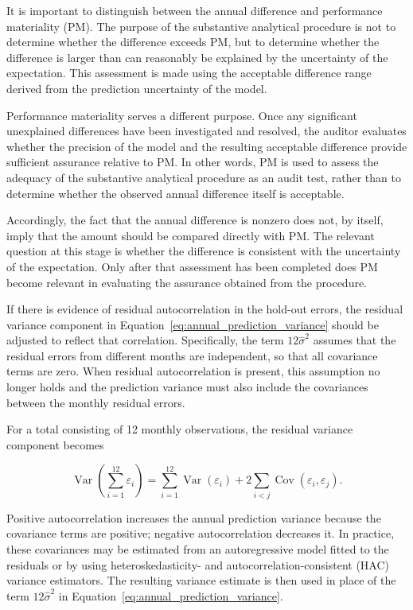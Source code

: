 \medskip


It is important to distinguish between the annual difference and performance materiality (PM). The purpose of the substantive analytical procedure is not to determine whether the difference exceeds PM, but to determine whether the difference is larger than can reasonably be explained by the uncertainty of the expectation. This assessment is made using the acceptable difference range derived from the prediction uncertainty of the model.

Performance materiality serves a different purpose. Once any sig\-ni\-ficant unexplained differences have been investigated and resolved, the auditor evaluates whether the precision of the model and the resulting acceptable difference provide sufficient assurance relative to PM. In other words, PM is used to assess the adequacy of the substantive analytical procedure as an audit test, rather than to determine whether the observed annual difference itself is acceptable.

Accordingly, the fact that the annual difference is nonzero does not, by itself, imply that the amount should be compared directly with PM. The relevant question at this stage is whether the difference is consistent with the uncertainty of the expectation. Only after that assessment has been completed does PM become relevant in evaluating the assurance obtained from the procedure.

\medskip
If there is evidence of residual autocorrelation in the hold-out errors, the residual variance component in Equation~\ref{eq:annual_prediction_variance} should be adjusted to reflect that correlation. Specifically, the term \(12\hat{\sigma}^2\) assumes that the residual errors from different months are independent, so that all covariance terms are zero. When residual autocorrelation is present, this assumption no longer holds and the prediction variance must also include the covariances between the monthly residual errors.

For a total consisting of 12 monthly observations, the residual variance component becomes

\[
\operatorname{Var}\!\left(\sum_{i=1}^{12}\varepsilon_i\right)
=
\sum_{i=1}^{12}\operatorname{Var}(\varepsilon_i)
+
2\sum_{i<j}\operatorname{Cov}(\varepsilon_i,\varepsilon_j).
\]

Positive autocorrelation increases the annual prediction variance because the covariance terms are positive; negative autocorrelation decreases it. In practice, these covariances may be estimated from an autoregressive model fitted to the residuals or by using heteroskedasticity- and autocorrelation-consistent (HAC) variance estimators. The resulting variance estimate is then used in place of the term \(12\hat{\sigma}^2\) in Equation~\ref{eq:annual_prediction_variance}.

